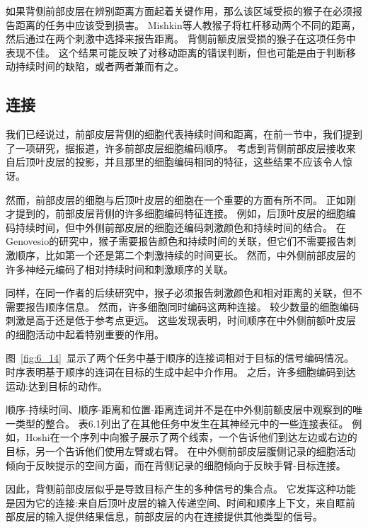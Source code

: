 如果背侧前部皮层在辨别距离方面起着关键作用，那么该区域受损的猴子在必须报告距离的任务中应该受到损害。
Mishkin等人\cite{mishkin1977kinesthetic}教猴子将杠杆移动两个不同的距离，然后通过在两个刺激中选择来报告距离。
背侧前额皮层受损的猴子在这项任务中表现不佳。
这个结果可能反映了对移动距离的错误判断，但也可能是由于判断移动持续时间的缺陷，或者两者兼而有之。



\subsection{连接}

我们已经说过，前部皮层背侧的细胞代表持续时间和距离，在前一节中，我们提到了一项研究，据报道，许多前部皮层细胞编码顺序\cite{ninokura2003representation,genovesio2009feature}。
考虑到背侧前部皮层接收来自后顶叶皮层的投影，并且那里的细胞编码相同的特征，这些结果不应该令人惊讶\cite{tudusciuc2007neuronal,bueti2009parietal}。


然而，前部皮层的细胞与后顶叶皮层的细胞在一个重要的方面有所不同。
正如刚才提到的，前部皮层背侧的许多细胞编码特征连接。
例如，后顶叶皮层的细胞编码持续时间，但中外侧前部皮层的细胞还编码刺激颜色和持续时间的结合。
在Genovesio\cite{genovesio2009feature}的研究中，猴子需要报告颜色和持续时间的关联，但它们不需要报告刺激顺序，比如第一个还是第二个刺激持续的时间更长。
然而，中外侧前部皮层的许多神经元编码了相对持续时间和刺激顺序的关联。


同样，在同一作者\cite{genovesio2011prefrontal}的后续研究中，猴子必须报告刺激颜色和相对距离的关联，但不需要报告顺序信息。
然而，许多细胞同时编码这两种连接。
较少数量的细胞编码刺激是高于还是低于参考点更远。
这些发现表明，时间顺序在中外侧前额叶皮层的细胞活动中起着特别重要的作用。


图~\ref{fig:6_14}~显示了两个任务中基于顺序的连接词相对于目标的信号编码情况。
时序表明基于顺序的连词在目标的生成中起中介作用。
之后，许多细胞编码到达运动:达到目标的动作。


顺序-持续时间、顺序-距离和位置-距离连词并不是在中外侧前额皮层中观察到的唯一类型的整合。
表6.1列出了在其他任务中发生在其神经元中的一些连接表征。
例如，Hoshi\cite{hoshi2004area}在一个序列中向猴子展示了两个线索，一个告诉他们到达左边或右边的目标，另一个告诉他们使用左臂或右臂。
在中外侧前部皮层腹侧记录的细胞活动倾向于反映提示的空间方面，而在背侧记录的细胞倾向于反映手臂-目标连接。


因此，背侧前部皮层似乎是导致目标产生的多种信号的集合点。
它发挥这种功能是因为它的连接:来自后顶叶皮层的输入传递空间、时间和顺序上下文，来自眶前部皮层的输入提供结果信息，前部皮层的内在连接提供其他类型的信号。


